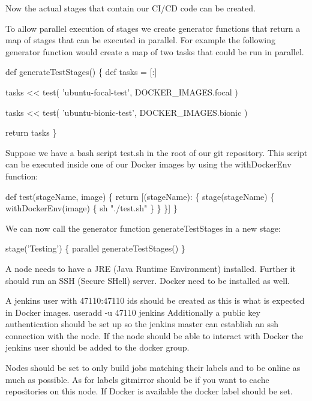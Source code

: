 Now the actual stages that contain our C\+I/\+CD code can be created.

To allow parallel execution of stages we create generator functions that return a map of stages that can be executed in parallel. For example the following generator function would create a map of two tasks that could be run in parallel.


\begin{DoxyCode}
def generateTestStages() \{
  def tasks = [:]

  tasks << test(
    'ubuntu-focal-test',
    DOCKER\_IMAGES.focal
  )

  tasks << test(
    'ubuntu-bionic-test',
    DOCKER\_IMAGES.bionic
  )

  return tasks
\}
\end{DoxyCode}


Suppose we have a bash script {\ttfamily test.\+sh} in the root of our git repository. This script can be executed inside one of our Docker images by using the {\ttfamily with\+Docker\+Env} function\+:


\begin{DoxyCode}
def test(stageName, image) \{
  return [(stageName): \{
    stage(stageName) \{
      withDockerEnv(image) \{
        sh "./test.sh"
      \}
    \}
  \}]
\}
\end{DoxyCode}


We can now call the generator function {\ttfamily generate\+Test\+Stages} in a new stage\+:


\begin{DoxyCode}
stage('Testing') \{
  parallel generateTestStages()
\}
\end{DoxyCode}


A node needs to have a J\+RE (Java Runtime Environment) installed. Further it should run an S\+SH (Secure S\+Hell) server. Docker need to be installed as well.

A {\ttfamily jenkins} user with 47110\+:47110 ids should be created as this is what is expected in Docker images. {\ttfamily useradd -\/u 47110 jenkins} Additionally a public key authentication should be set up so the jenkins master can establish an ssh connection with the node. If the node should be able to interact with Docker the jenkins user should be added to the {\ttfamily docker} group.

Nodes should be set to only build jobs matching their labels and to be online as much as possible. As for labels {\ttfamily gitmirror} should be if you want to cache repositories on this node. If Docker is available the {\ttfamily docker} label should be set.

